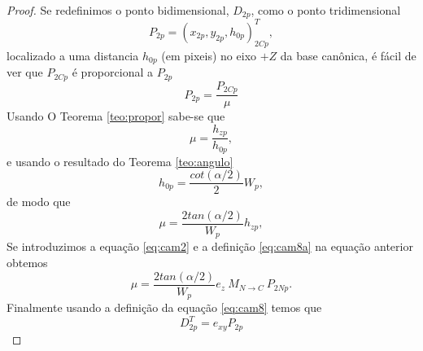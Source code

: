 \documentclass[a4paper,10pt]{article}
\begin{document}
\begin{proof}
Se redefinimos o ponto bidimensional, $D_{2p}$,  como o ponto tridimensional 
\begin{equation}\label{eq:cam3a}
 P_{2p}=(x_{2p},y_{2p},h_{0p})^T_{2Cp},
\end{equation}
localizado a uma distancia $h_{0p}$ (em pixeis) no eixo $+Z$ da base canônica,
é fácil de ver que $P_{2Cp}$ é proporcional a $P_{2p}$
\begin{equation}\label{eq:cam4}
 P_{2p}= \frac{P_{2Cp}}{\mu} 
\end{equation}
Usando O Teorema \ref{teo:propor} sabe-se que
\begin{equation}\label{eq:cam5}
 \mu = \frac{h_{zp}}{h_{0p}},
\end{equation}
e usando o resultado do Teorema \ref{teo:angulo}
\begin{equation}\label{eq:cam6a}
{h_{0p}} = \frac{cot(\alpha/2)}{2}{W_p},
\end{equation}
de modo que
\begin{equation}\label{eq:cam6}
 \mu = \frac{2 tan(\alpha/2)}{{W_p}}{h_{zp}},
\end{equation}
Se  introduzimos a equação \eqref{eq:cam2} e a definição \eqref{eq:cam8a} na equação anterior obtemos
\begin{equation}\label{eq:cam7}
 \mu = \frac{2 tan(\alpha/2)}{{W_p}} {e_z~M_{N \rightarrow C}~P_{2Np}}.
\end{equation}
Finalmente usando a definição da equação \eqref{eq:cam8} temos que
\begin{equation}\label{eq:camp}
 D^T_{2p}=e_{xy}P_{2p}
\end{equation}
\end{proof}
\end{document}
